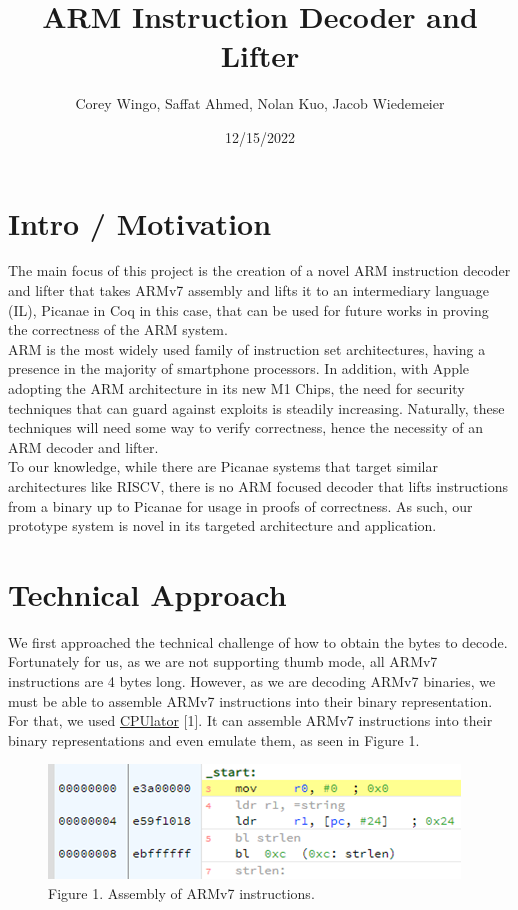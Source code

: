 \documentclass[twocolumn]{article}
\title{ARM Instruction Decoder and Lifter}
\author{Corey Wingo, Saffat Ahmed, Nolan Kuo, Jacob Wiedemeier}
\date{12/15/2022}
\begin{document}
\maketitle


\section*{\centering Intro / Motivation}
\vspace{0.3cm}
The main focus of this project is the creation of a novel ARM instruction decoder and lifter that takes ARMv7 assembly and lifts it to an intermediary language (IL), Picanae in Coq in this case, that can be used for future works in proving the correctness of the ARM system.\\

ARM is the most widely used family of instruction set architectures, having a presence in the majority of smartphone processors. In addition, with Apple adopting the ARM architecture in its new M1 Chips, the need for security techniques that can guard against exploits is steadily increasing. Naturally, these techniques will need some way to verify correctness, hence the necessity of an ARM decoder and lifter.\\

To our knowledge, while there are Picanae systems that target similar architectures like RISCV, there is no ARM focused decoder that lifts instructions from a binary up to Picanae for usage in proofs of correctness. As such, our prototype system is novel in its targeted architecture and application. 

\section*{\centering Technical Approach}
\vspace{0.3cm}
We first approached the technical challenge of how to obtain the bytes to decode. Fortunately for us, as we are not supporting thumb mode, all ARMv7 instructions are 4 bytes long. However, as we are decoding ARMv7 binaries, we must be able to assemble ARMv7 instructions into their binary representation. For that, we used \href{https://cpulator.01xz.net/?sys=arm}{CPUlator} [1]. It can assemble ARMv7 instructions into their binary representations and even emulate them, as seen in Figure 1.\\

\begin{figure}[H]
\includegraphics[width=\linewidth]{cpulator_example.png}\\
Figure 1. Assembly of ARMv7 instructions.
\centering
\end{figure}
\end{document}

